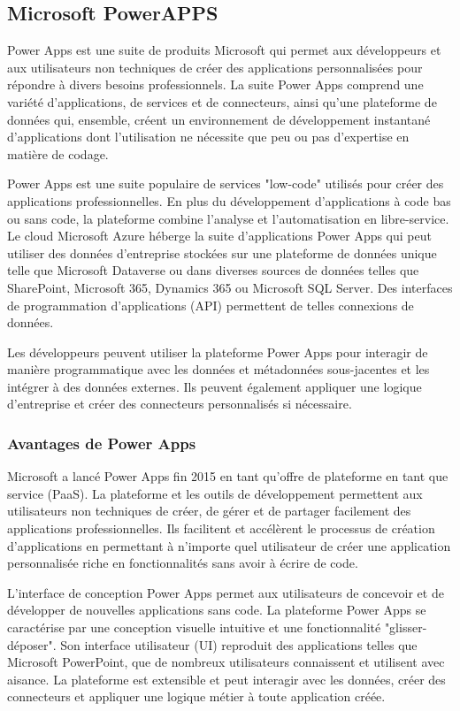\documentclass[a4paper, oneside, 12pt, final]{extreport}
\begin{document}
\subsection{Microsoft PowerAPPS}
Power Apps est une suite de produits Microsoft qui permet aux développeurs et aux utilisateurs non techniques de créer des applications personnalisées pour répondre à divers besoins professionnels. La suite Power Apps comprend une variété d'applications, de services et de connecteurs, ainsi qu'une plateforme de données qui, ensemble, créent un environnement de développement instantané d'applications dont l'utilisation ne nécessite que peu ou pas d'expertise en matière de codage.


Power Apps est une suite populaire de services "low-code" utilisés pour créer des applications professionnelles. En plus du développement d'applications à code bas ou sans code, la plateforme combine l'analyse et l'automatisation en libre-service. Le cloud Microsoft Azure héberge la suite d'applications Power Apps qui peut utiliser des données d'entreprise stockées sur une plateforme de données unique telle que Microsoft Dataverse ou dans diverses sources de données telles que SharePoint, Microsoft 365, Dynamics 365 ou Microsoft SQL Server. Des interfaces de programmation d'applications (API) permettent de telles connexions de données.


Les développeurs peuvent utiliser la plateforme Power Apps pour interagir de manière programmatique avec les données et métadonnées sous-jacentes et les intégrer à des données externes. Ils peuvent également appliquer une logique d'entreprise et créer des connecteurs personnalisés si nécessaire.

\subsubsection{Avantages de Power Apps}
Microsoft a lancé Power Apps fin 2015 en tant qu'offre de plateforme en tant que service (PaaS). La plateforme et les outils de développement permettent aux utilisateurs non techniques de créer, de gérer et de partager facilement des applications professionnelles. Ils facilitent et accélèrent le processus de création d'applications en permettant à n'importe quel utilisateur de créer une application personnalisée riche en fonctionnalités sans avoir à écrire de code.


L'interface de conception Power Apps permet aux utilisateurs de concevoir et de développer de nouvelles applications sans code.
La plateforme Power Apps se caractérise par une conception visuelle intuitive et une fonctionnalité "glisser-déposer". Son interface utilisateur (UI) reproduit des applications telles que Microsoft PowerPoint, que de nombreux utilisateurs connaissent et utilisent avec aisance. La plateforme est extensible et peut interagir avec les données, créer des connecteurs et appliquer une logique métier à toute application créée.
\end{document}
